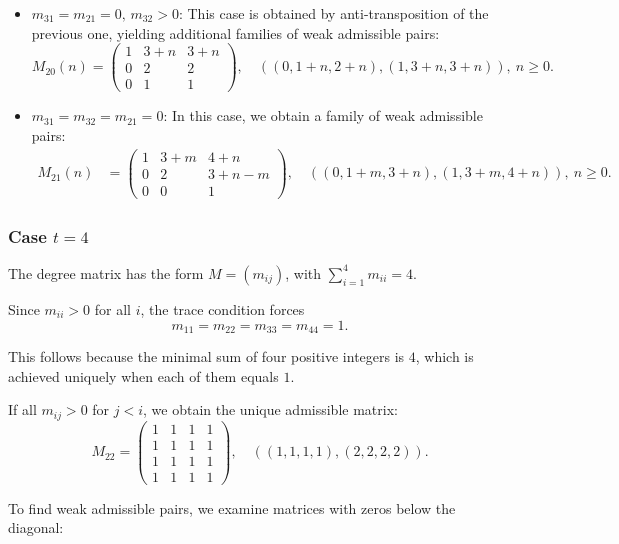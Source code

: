 \documentclass[12pt,reqno]{amsart}
\theoremstyle{plain}
\theoremstyle{definition}
\theoremstyle{remark}
\theoremstyle{definition}
\begin{document}
\begin{itemize}
\begin{itemize}
    \item \textbf{$m_{31} = m_{21} = 0,\, m_{32}>0$}: This case is obtained by anti-transposition of the previous one, yielding additional families of weak admissible pairs:
    \[
    M_{20}(n) = \begin{pmatrix}1 & 3+n & 3+n\\
0 & 2 & 2 \\
0 & 1 & 1
\end{pmatrix},\quad ((0,1+n, 2+n),(1, 3+n, 3+n)),\ n\geq 0.
    \]

    \item \textbf{$m_{31} = m_{32} = m_{21} = 0$}: In this case, we obtain a family of weak admissible pairs:
    \begin{align*}
    M_{21}(n) &= \begin{pmatrix}1 & 3+m & 4+n\\
0 & 2 & 3+n-m \\
0 & 0 & 1\end{pmatrix},\quad ((0,1+m, 3+n),(1, 3+m, 4+n)),\ n\geq 0.
    \end{align*}
\end{itemize}
\end{itemize}


\subsubsection{\textbf{Case $t=4$}}

The degree matrix has the form $M=(m_{ij})$, with $\sum_{i=1}^4 m_{ii}=4.$

Since $m_{ii}>0$ for all $i$, the trace condition forces
\[
m_{11}=m_{22}=m_{33}=m_{44}=1.
\]

\noindent This follows because the minimal sum of four positive integers is $4$, which is achieved uniquely when each of them equals $1$.

\vskip2mm

\noindent If all $m_{ij} > 0$ for $j < i$, we obtain the unique admissible matrix:
$$
M_{22}=\left( \begin{array}{cccc}
1 & 1 & 1 & 1\\
1 & 1 & 1 & 1 \\
1 & 1 & 1 & 1 \\
1 & 1 & 1 & 1 
\end{array}
\right),\quad ((1, 1, 1, 1),(2, 2, 2, 2)).
$$

To find weak admissible pairs, we examine matrices with zeros below the diagonal:
\end{document}
